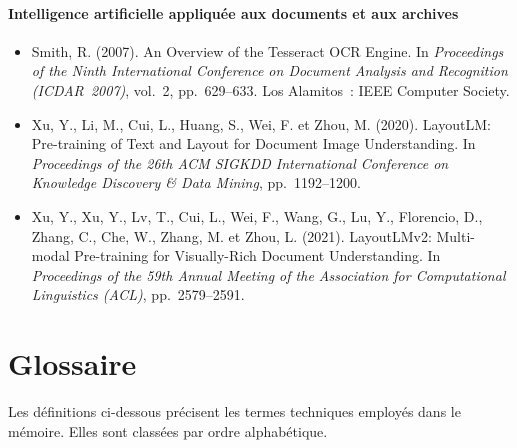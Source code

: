 \documentclass[12pt,a4paper]{report}
\begin{document}
\subsubsection*{Intelligence artificielle appliquée aux documents et aux archives}
\begin{itemize}[leftmargin=1.5em, itemsep=0.6em, label={}]
  \item\label{ref:smith2007} Smith, R. (2007). An Overview of the Tesseract OCR Engine. In \textit{Proceedings of the Ninth International Conference on Document Analysis and Recognition (ICDAR~2007)}, vol.~2, pp.~629--633. Los Alamitos~: IEEE Computer Society.

  \item\label{ref:xu2020} Xu, Y., Li, M., Cui, L., Huang, S., Wei, F. et Zhou, M. (2020). LayoutLM: Pre-training of Text and Layout for Document Image Understanding. In \textit{Proceedings of the 26th ACM SIGKDD International Conference on Knowledge Discovery \& Data Mining}, pp.~1192--1200.

  \item\label{ref:xu2021} Xu, Y., Xu, Y., Lv, T., Cui, L., Wei, F., Wang, G., Lu, Y., Florencio, D., Zhang, C., Che, W., Zhang, M. et Zhou, L. (2021). LayoutLMv2: Multi-modal Pre-training for Visually-Rich Document Understanding. In \textit{Proceedings of the 59th Annual Meeting of the Association for Computational Linguistics (ACL)}, pp.~2579--2591.
\end{itemize}

\chapter*{Glossaire}

Les définitions ci-dessous précisent les termes techniques employés dans le mémoire. Elles sont classées par ordre alphabétique.
\end{document}
